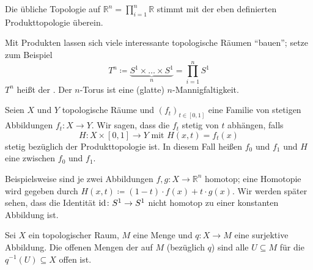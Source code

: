 \begin{bemerkung}[{name=[Topologie des euklidischen Raumes]}]
	Die übliche Topologie auf $\mathbb{R}^n = \prod_{i =1}^n \mathbb{R}$ stimmt mit der eben definierten Produkttopologie überein.
\end{bemerkung}

\begin{beispiel}[{name=[Torus]}]
	Mit Produkten lassen sich viele interessante topologische Räumen \enquote{bauen}; setze zum Beispiel
	\[
		T^n \coloneqq \underbrace{S^1 \times \ldots \times S^1}_{n} = \prod_{i=1}^n S^1
	\]
	$T^n$ heißt der . Der $n$-Torus ist eine (glatte) $n$-Mannigfaltigkeit.
	\begin{figure}[hbt]
	\end{figure}
\end{beispiel}

\begin{definition}[{name=[Homotopie]}]
	Seien $X$ und $Y$ topologische Räume und $(f_t)_{t \in [0,1]}$ eine Familie von stetigen Abbildungen $f_t \colon X \to Y$.
	Wir sagen, dass die $f_t$ stetig von $t$ abhängen, falls
	\[
		H \colon X \times [0,1] \longrightarrow Y \text{ mit } H(x,t) = f_t(x)
	\]
	stetig bezüglich der Produkttopologie ist.
	In diesem Fall heißen $f_0$ und $f_1$  und $H$ eine  zwischen $f_0$ und $f_1$.
\end{definition}

Beispielsweise sind je zwei Abbildungen $f,g \colon X \to \mathbb{R}^n$ homotop; eine Homotopie wird gegeben durch $H(x,t) \coloneqq (1-t)\cdot f(x) + t \cdot g(x)$.
Wir werden später sehen, dass die Identität $\operatorname{id} \colon S^1 \to S^1$ nicht homotop zu einer konstanten Abbildung ist.

\begin{definition}[{name=[Quotiententopologie]}]
	Sei $X$ ein topologischer Raum, $M$ eine Menge und $q \colon X \to M$ eine surjektive Abbildung.
	Die offenen Mengen der  auf $M$ (bezüglich $q$) sind alle $U \subseteq M$ für die $q^{-1} (U ) \subseteq X$ offen ist.
\end{definition}

